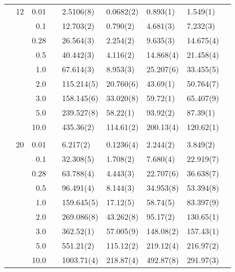 \begin{table}[H]
\begin{tabularx}{\textwidth}{R{1cm}rrcR{2.3cm}R{2.3cm}R{2.3cm}R{2.3cm}R{1cm}}
		&12 & 0.01 && 2.5106(8) & 0.0682(2) & 0.893(1) & 1.549(1) \\
		&& 0.1 && 12.703(2) & 0.790(2) & 4.681(3) & 7.232(3) \\
		&& 0.28 && 26.564(3) & 2.254(2) & 9.635(3) & 14.675(4) \\
		&& 0.5 && 40.442(3) & 4.116(2) & 14.868(4) & 21.458(4) \\
		&& 1.0 && 67.614(3) & 8.953(3) & 25.207(6) & 33.455(5) \\
		&& 2.0 && 115.214(5) & 20.760(6) & 43.69(1) & 50.764(7) \\
		&& 3.0 && 158.145(6) & 33.020(8) & 59.72(1) & 65.407(9) \\ 
		&& 5.0 && 239.527(8) & 58.22(1) & 93.92(2) & 87.39(1) \\
		&& 10.0 && 435.36(2) & 114.61(2) & 200.13(4) & 120.62(1) \\
		\hdashline \\
		
		&20 & 0.01 && 6.217(2) & 0.1236(4) & 2.244(2) & 3.849(2) \\
		&& 0.1 && 32.308(5) & 1.708(2) & 7.680(4) & 22.919(7) \\
		&& 0.28 && 63.788(4) & 4.443(3) & 22.707(6) & 36.638(7) \\
		&& 0.5 && 96.491(4) & 8.144(3) & 34.953(8) & 53.394(8) \\
		&& 1.0 && 159.645(5) & 17.12(5) & 58.74(5) & 83.397(9) \\
		&& 2.0 && 269.086(8) & 43.262(8) & 95.17(2) & 130.65(1) \\
		&& 3.0 && 362.52(1) & 57.005(9) & 148.08(2) & 157.43(1) \\ 
		&& 5.0 && 551.21(2) & 115.12(2) & 219.12(4) & 216.97(2) \\
		&& 10.0 && 1003.71(4) & 218.87(4) & 492.87(8) & 291.97(3) \\
		\hline \hline
	\end{tabularx}
\end{table} 

